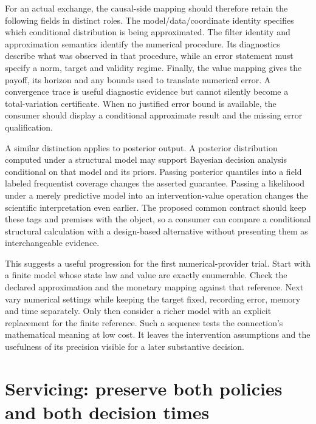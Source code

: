 For an actual exchange, the causal-side mapping should therefore retain
the following fields in distinct roles. The model/data/coordinate identity
specifies which conditional distribution is being approximated. The
filter identity and approximation semantics identify the numerical
procedure. Its diagnostics describe what was observed in that procedure,
while an error statement must specify a norm, target and validity regime.
Finally, the value mapping gives the payoff, its horizon and any bounds
used to translate numerical error. A convergence trace is useful diagnostic
evidence but cannot silently become a total-variation certificate. When no
justified error bound is available, the consumer should display a
conditional approximate result and the missing error qualification.

A similar distinction applies to posterior output. A posterior distribution
computed under a structural model may support Bayesian decision analysis
conditional on that model and its priors. Passing posterior quantiles into
a field labeled frequentist coverage changes the asserted guarantee. Passing
a likelihood under a merely predictive model into an intervention-value
operation changes the scientific interpretation even earlier. The proposed
common contract should keep these tags and premises with the object, so a
consumer can compare a conditional structural calculation with a design-based
alternative without presenting them as interchangeable evidence.

This suggests a useful progression for the first numerical-provider trial.
Start with a finite model whose state law and value are exactly enumerable.
Check the declared approximation and the monetary mapping against that
reference. Next vary numerical settings while keeping the target fixed,
recording error, memory and time separately. Only then consider a richer
model with an explicit replacement for the finite reference. Such a sequence
tests the connection's mathematical meaning at low cost. It leaves the
intervention assumptions and the usefulness of its precision visible for a
later substantive decision.

\section{Servicing: preserve both policies and both decision times}

